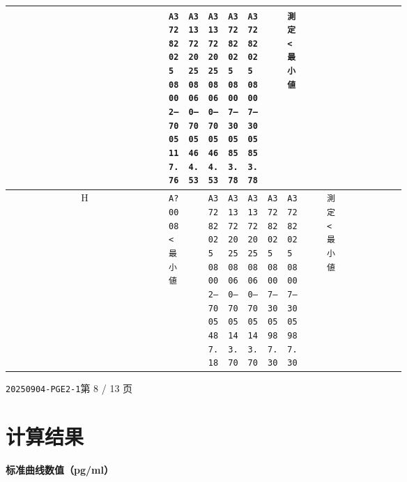 \documentclass[UTF8,10pt,a4paper,fontset=fandol]{ctexart}
\begin{document}
\begin{center}
\begin{tabular}{c|*{12}{p{0.055\linewidth}|}}
 &
\texttt{A37282025\\08002--7005\\117.76} &
\texttt{A313722025\\08060--7005\\464.53} &
\texttt{A313722025\\08060--7005\\464.53} &
\texttt{A37282025\\08007--3005\\853.78} &
\texttt{A37282025\\08007--3005\\853.78} &
 &
\texttt{測定\\\textless{}最小値} &
 &
 &
\\ \hline
H &
\texttt{A?0008\\\textless{}最小値} &
 &
\texttt{A37282025\\08002--7005\\487.18} &
\texttt{A313722025\\08060--7005\\143.70} &
\texttt{A313722025\\08060--7005\\143.70} &
\texttt{A37282025\\08007--3005\\987.30} &
\texttt{A37282025\\08007--3005\\987.30} &
 &
\texttt{測定\\\textless{}最小値} &
 &
 &
\\ \hline
\end{tabular}
\end{center}


\newpage

\noindent\texttt{20250904-PGE2-1}\hfill 第 8 / 13 页

\section*{计算结果}

\noindent\textbf{标准曲线数值（pg/ml）}
\end{document}
